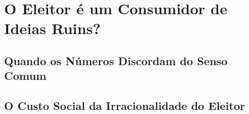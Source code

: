 


\chapter{O Eleitor é um Consumidor de Ideias Ruins?} 

\section{Quando os Números Discordam do Senso Comum} %



\section{O Custo Social da Irracionalidade do Eleitor} %

